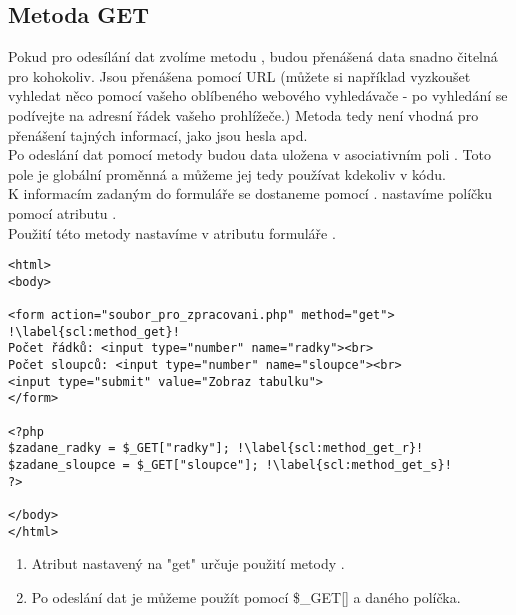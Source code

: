 \subsection{Metoda GET}
Pokud pro odesílání dat zvolíme metodu , budou přenášená data snadno čitelná pro kohokoliv. Jsou přenášena pomocí URL (můžete si například vyzkoušet vyhledat něco pomocí vašeho oblíbeného webového vyhledávače - po vyhledání se podívejte na adresní řádek vašeho prohlížeče.) Metoda  tedy není vhodná pro přenášení tajných informací, jako jsou hesla apd.\\
Po odeslání dat pomocí metody  budou data uložena v asociativním poli . Toto pole je globální proměnná a můžeme jej tedy používat kdekoliv v kódu.\\
K informacím zadaným do formuláře se dostaneme pomocí  .  nastavíme políčku pomocí atributu .\\
Použití této metody nastavíme v atributu formuláře .\\

\begin{minipage}[t]{.45\textwidth}
\begin{code}
\begin{verbatim}
<html>
<body>

<form action="soubor_pro_zpracovani.php" method="get"> !\label{scl:method_get}!
Počet řádků: <input type="number" name="radky"><br>
Počet sloupců: <input type="number" name="sloupce"><br>
<input type="submit" value="Zobraz tabulku">
</form>

<?php
$zadane_radky = $_GET["radky"];	!\label{scl:method_get_r}!
$zadane_sloupce = $_GET["sloupce"];	!\label{scl:method_get_s}!
?>

</body>
</html> 
\end{verbatim}

\label{code:php_form_get}
\end{code}
\end{minipage}
\begin{minipage}[t]{.45\textwidth}
\vspace{2.7cm}
\begin{enumerate}
\item[ř. \ref{scl:method_get}:] Atribut  nastavený na "get" určuje použití metody .
\item[ř. \ref{scl:method_get_r}, \ref{scl:method_get_s}:] Po odeslání dat je můžeme použít pomocí \$\_GET[] a  daného políčka.
\end{enumerate}
\end{minipage}


